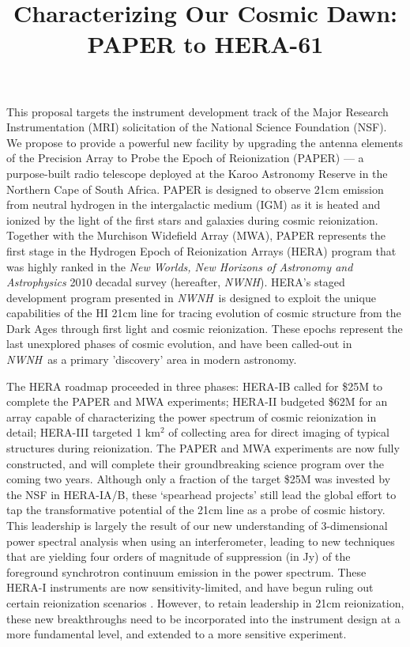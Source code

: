 \documentclass[preprint]{aastex}
\def\nwnh{{\sl NWNH}}
\begin{document}
\title{Characterizing Our Cosmic Dawn: PAPER to HERA-61}

This proposal targets the instrument development track of the Major
Research Instrumentation (MRI) solicitation of the National Science
Foundation (NSF). We propose to provide a powerful new facility by upgrading the antenna elements of the
Precision Array to Probe the Epoch of Reionization (PAPER) --- a
purpose-built radio telescope deployed at the Karoo Astronomy Reserve
in the Northern Cape of South Africa.  PAPER is designed to observe
21cm emission from neutral hydrogen in the intergalactic medium (IGM)
as it is heated and ionized by the light of the first stars and
galaxies during cosmic reionization. Together with the Murchison
Widefield Array (MWA), PAPER represents the first stage in the
Hydrogen Epoch of Reionization Arrays (HERA) program that was highly
ranked in the {\it New Worlds, New Horizons of Astronomy and
Astrophysics} 2010 decadal survey (hereafter, \nwnh).  HERA's staged
development program presented in \nwnh\ is designed to exploit the
unique capabilities of the HI 21cm line for tracing
evolution of cosmic structure from the Dark Ages through first light
and cosmic reionization. These epochs represent the last unexplored phases of
cosmic evolution, and have been called-out
in \nwnh\ as a primary 'discovery' area in modern astronomy.

The HERA roadmap proceeded in three phases: HERA-IB called for \$25M
to complete the PAPER and MWA experiments; HERA-II budgeted \$62M for
an array capable of characterizing the power spectrum of cosmic
reionization in detail; HERA-III targeted 1 km$^2$ of collecting area
for direct imaging of typical structures during reionization.  The
PAPER and MWA experiments are now fully constructed, and will complete
their groundbreaking science program over the coming two
years. Although only a fraction of the target \$25M was invested by
the NSF in HERA-IA/B, these `spearhead projects' still lead the global
effort to tap the transformative potential of the 21cm line as a probe
of cosmic history.  This leadership is largely the result of our new
understanding of 3-dimensional power spectral
analysis when using an interferometer, leading to new techniques that
are yielding four orders of magnitude of suppression (in Jy) of the
foreground synchrotron continuum emission in the power spectrum.
These HERA-I instruments are now sensitivity-limited, and have
begun ruling out certain reionization scenarios
\citep{parsons_et_al2013}.  However, to retain leadership in 21cm
reionization, these new breakthroughs need to be incorporated into the
instrument design at a more fundamental level, and extended to a more
sensitive experiment.
\end{document}
